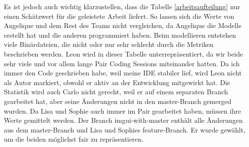 Es ist jedoch auch wichtig klarzustellen, dass die Tabelle \ref{arbeitsaufteilung} nur einen Schätzwert für die geleistete Arbeit liefert. So lassen sich die Werte von Angelique und dem Rest des Teams nicht vergleichen, da Angelique die Modelle erstellt hat und die anderen programmiert haben. Beim modellieren entstehen viele Binärdateien, die nicht oder nur sehr schlecht durch die Metriken beschrieben werden. Leon wird in dieser Tabelle unterrepräsentiert, da wir beide sehr viele und vor allem lange Pair Coding Sessions miteinander hatten. Da ich immer den Code geschrieben habe, weil meine IDE stabiler lief, wird Leon nicht als Autor markiert, obwohl er aktiv an der Entwicklung mitgewirkt hat. Die Statistik wird auch Carlo nicht gerecht, weil er auf einem separaten Branch gearbeitet hat, aber seine Änderungen nicht in den master-Branch gemerged wurden. Da Lisa und Sophie auch immer im Pair gearbeitet haben, müssen ihre Werte gemittelt werden. Der Branch imgui-with-master enthält alle Änderungen aus dem master-Branch und Lisa und Sophies feature-Branch. Er wurde gewählt, um die beiden möglichst fair zu repräsentieren.